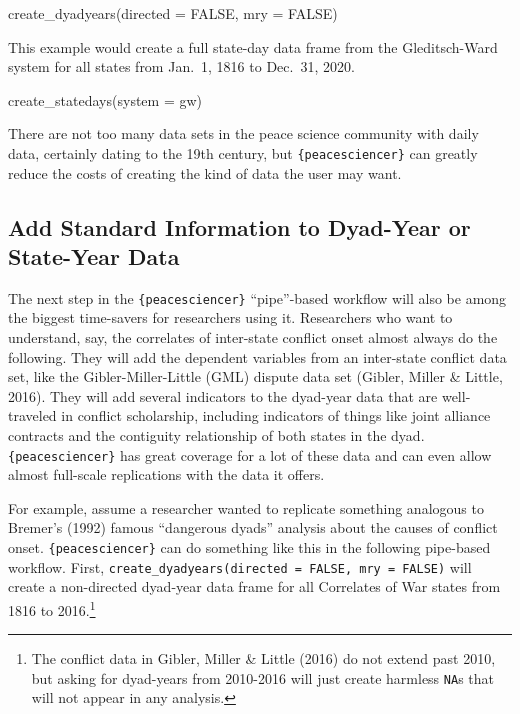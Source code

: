 \documentclass[
  11pt,
]{article}
\newenvironment{Shaded}{\begin{snugshade}}{\end{snugshade}}
\newcommand{\AttributeTok}[1]{\textcolor[rgb]{0.77,0.63,0.00}{#1}}
\newcommand{\ConstantTok}[1]{\textcolor[rgb]{0.00,0.00,0.00}{#1}}
\newcommand{\FunctionTok}[1]{\textcolor[rgb]{0.00,0.00,0.00}{#1}}
\newcommand{\NormalTok}[1]{#1}
\newcommand{\StringTok}[1]{\textcolor[rgb]{0.31,0.60,0.02}{#1}}
\begin{document}
\begin{Shaded}
\begin{Highlighting}[]
\FunctionTok{create\_dyadyears}\NormalTok{(}\AttributeTok{directed =} \ConstantTok{FALSE}\NormalTok{, }\AttributeTok{mry =} \ConstantTok{FALSE}\NormalTok{)}
\end{Highlighting}
\end{Shaded}

This example would create a full state-day data frame from the Gleditsch-Ward system for all states from Jan.~1, 1816 to Dec.~31, 2020.

\begin{Shaded}
\begin{Highlighting}[]
\FunctionTok{create\_statedays}\NormalTok{(}\AttributeTok{system =} \StringTok{\textquotesingle{}gw\textquotesingle{}}\NormalTok{)}
\end{Highlighting}
\end{Shaded}

There are not too many data sets in the peace science community with daily data, certainly dating to the 19th century, but \texttt{\{peacesciencer\}} can greatly reduce the costs of creating the kind of data the user may want.

\hypertarget{add-standard-information-to-dyad-year-or-state-year-data}{%
\subsection{Add Standard Information to Dyad-Year or State-Year Data}\label{add-standard-information-to-dyad-year-or-state-year-data}}

The next step in the \texttt{\{peacesciencer\}} ``pipe''-based workflow will also be among the biggest time-savers for researchers using it. Researchers who want to understand, say, the correlates of inter-state conflict onset almost always do the following. They will add the dependent variables from an inter-state conflict data set, like the Gibler-Miller-Little (GML) dispute data set (Gibler, Miller \& Little, 2016). They will add several indicators to the dyad-year data that are well-traveled in conflict scholarship, including indicators of things like joint alliance contracts and the contiguity relationship of both states in the dyad. \texttt{\{peacesciencer\}} has great coverage for a lot of these data and can even allow almost full-scale replications with the data it offers.

For example, assume a researcher wanted to replicate something analogous to Bremer's (1992) famous ``dangerous dyads'' analysis about the causes of conflict onset. \texttt{\{peacesciencer\}} can do something like this in the following pipe-based workflow. First, \texttt{create\_dyadyears(directed\ =\ FALSE,\ mry\ =\ FALSE)} will create a non-directed dyad-year data frame for all Correlates of War states from 1816 to 2016.\footnote{The conflict data in Gibler, Miller \& Little (2016) do not extend past 2010, but asking for dyad-years from 2010-2016 will just create harmless \texttt{NA}s that will not appear in any analysis.}
\end{document}
